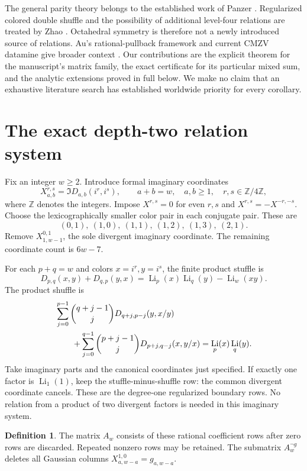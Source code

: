 \documentclass[11pt]{article}
\numberwithin{equation}{section}
\theoremstyle{plain}
\theoremstyle{definition}
\newtheorem{definition}[theorem]{Definition}
\theoremstyle{remark}
\DeclareMathOperator{\Li}{Li}
\newcommand{\Z}{\mathbb Z}
\begin{document}
The general parity theory belongs to the established work of Panzer
\cite{Panzer}. Regularized colored double shuffle and the possibility
of additional level-four relations are treated by Zhao
\cite{ZhaoStandard,ZhaoOctahedral}. Octahedral symmetry is therefore
not a newly introduced source of relations. Au's rational-pullback
framework and current CMZV datamine give broader context
\cite{Au}. Our contributions are the explicit theorem for the
manuscript's matrix family, the exact certificate for its particular
mixed sum, and the analytic extensions proved in full below.
We make no claim that an exhaustive literature search has established
worldwide priority for every corollary.

\section{The exact depth-two relation system}
\label{sec:relation-system}

Fix an integer $w\ge2$. Introduce formal imaginary coordinates
\[
 X_{a,b}^{r,s}=\Im D_{a,b}(i^r,i^s),
 \qquad a+b=w,\quad a,b\ge1,\quad r,s\in\Z/4\Z,
\]
where $\Z$ denotes the integers. Impose
$X^{r,s}=0$ for even $r,s$ and
$X^{r,s}=-X^{-r,-s}$. Choose the lexicographically smaller color pair
in each conjugate pair. These are
\[
 (0,1),\ (1,0),\ (1,1),\ (1,2),\ (1,3),\ (2,1).
\]
Remove $X_{1,w-1}^{0,1}$, the sole divergent imaginary coordinate.
The remaining coordinate count is $6w-7$.

For each $p+q=w$ and colors $x=i^r,y=i^s$, the finite product stuffle is
\begin{equation}\label{eq:depth-two-stuffle}
 D_{p,q}(x,y)+D_{q,p}(y,x)
 =\Li_p(x)\Li_q(y)-\Li_w(xy).
\end{equation}
The product shuffle is
\begin{align}\label{eq:depth-two-shuffle}
 &\sum_{j=0}^{p-1}\binom{q+j-1}{j}D_{q+j,p-j}(y,x/y)\notag\\
 &\qquad+\sum_{j=0}^{q-1}\binom{p+j-1}{j}D_{p+j,q-j}(x,y/x)
 =\Li_p(x)\Li_q(y).
\end{align}
Take imaginary parts and the canonical coordinates just specified.
If exactly one factor is $\Li_1(1)$, keep the stuffle-minus-shuffle
row: the common divergent coordinate cancels. These are the
degree-one regularized boundary rows. No relation from a product of
two divergent factors is needed in this imaginary system.

\begin{definition}\label{def:Aw}
The matrix $A_w$ consists of these rational coefficient rows after
zero rows are discarded. Repeated nonzero rows may be retained.
The submatrix $A_w^{\neg g}$ deletes all Gaussian columns
$X_{a,w-a}^{1,0}=g_{a,w-a}$.
\end{definition}
\end{document}
